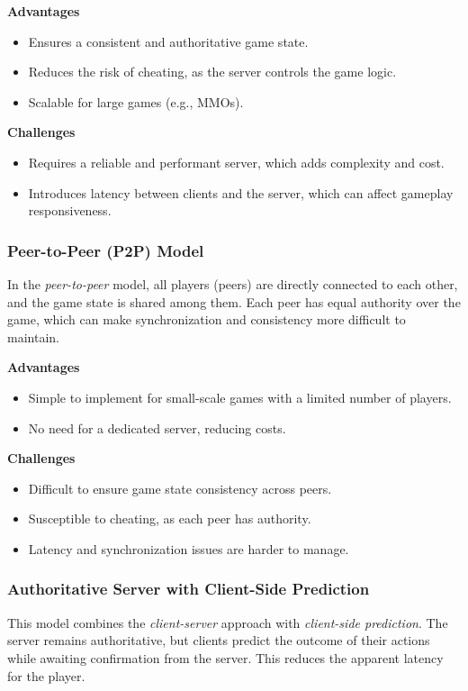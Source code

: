 \documentclass{article} %
\begin{document}
\textbf{Advantages}
\begin{itemize}
	\item Ensures a consistent and authoritative game state.
	\item Reduces the risk of cheating, as the server controls the game logic.
	\item Scalable for large games (e.g., MMOs).
\end{itemize}

\textbf{Challenges}
\begin{itemize}
	\item Requires a reliable and performant server, which adds complexity and cost.
	\item Introduces latency between clients and the server, which can affect gameplay responsiveness.
\end{itemize}

\subsubsection{Peer-to-Peer (P2P) Model}
In the \textit{peer-to-peer} model, all players (peers) are directly connected to each other, and the game state is shared among them. Each peer has equal authority over the game, which can make synchronization and consistency more difficult to maintain.

\textbf{Advantages}
\begin{itemize}
	\item Simple to implement for small-scale games with a limited number of players.
	\item No need for a dedicated server, reducing costs.
\end{itemize}

\textbf{Challenges}
\begin{itemize}
	\item Difficult to ensure game state consistency across peers.
	\item Susceptible to cheating, as each peer has authority.
	\item Latency and synchronization issues are harder to manage.
\end{itemize}

\subsubsection{Authoritative Server with Client-Side Prediction}
This model combines the \textit{client-server} approach with \textit{client-side prediction}. The server remains authoritative, but clients predict the outcome of their actions while awaiting confirmation from the server. This reduces the apparent latency for the player.
\end{document}
